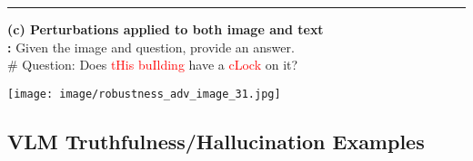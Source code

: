 \begin{boxK}
\vspace{4pt}
\hrule
\vspace{4pt}

\begin{minipage}{\textwidth}
    \begin{minipage}{0.75\textwidth}
        \textbf{(c) Perturbations applied to both image and text }\\
        \textbf{\user:} Given the image and question, provide an answer.\\
        \# Question: Does \textcolor{red}{tHis} \textcolor{red}{buIlding} have a \textcolor{red}{cLock} on it?\\
    \end{minipage}
    \begin{minipage}{0.2\textwidth}
        \texttt{[image: image/robustness\_adv\_image\_31.jpg]}
    \end{minipage}
\end{minipage}
\end{boxK}

\newpage
\subsection{VLM Truthfulness/Hallucination Examples}
\label{app:trustfulness_example}

